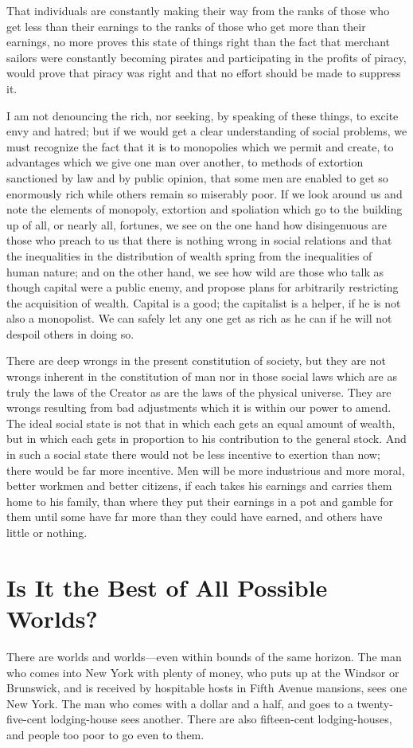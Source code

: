 \documentclass{book}
\begin{document}
That individuals are constantly making their way from the ranks of those who get less than their earnings to the ranks of those who get more than their earnings, no more proves this state of things right than the fact that merchant sailors were constantly becoming pirates and participating in the profits of piracy, would prove that piracy was right and that no effort should be made to suppress it.

I am not denouncing the rich, nor seeking, by speaking of these things, to excite envy and hatred; but if we would get a clear understanding of social problems, we must recognize the fact that it is to monopolies which we permit and create, to advantages which we give one man over another, to methods of extortion sanctioned by law and by public opinion, that some men are enabled to get so enormously rich while others remain so miserably poor. If we look around us and note the elements of monopoly, extortion and spoliation which go to the building up of all, or nearly all, fortunes, we see on the one hand how disingenuous are those who preach to us that there is nothing wrong in social relations and that the inequalities in the distribution of wealth spring from the inequalities of human nature; and on the other hand, we see how wild are those who talk as though capital were a public enemy, and propose plans for arbitrarily restricting the acquisition of wealth. Capital is a good; the capitalist is a helper, if he is not also a monopolist. We can safely let any one get as rich as he can if he will not despoil others in doing so.

There are deep wrongs in the present constitution of society, but they are not wrongs inherent in the constitution of man nor in those social laws which are as truly the laws of the Creator as are the laws of the physical universe. They are wrongs resulting from bad adjustments which it is within our power to amend. The ideal social state is not that in which each gets an equal amount of wealth, but in which each gets in proportion to his contribution to the general stock. And in such a social state there would not be less incentive to exertion than now; there would be far more incentive. Men will be more industrious and more moral, better workmen and better citizens, if each takes his earnings and carries them home to his family, than where they put their earnings in a pot and gamble for them until some have far more than they could have earned, and others have little or nothing.

\chapter{Is It the Best of All Possible Worlds?}
\label{chapter-7}
There are worlds and worlds—even within bounds of the same horizon. The man who comes into New York with plenty of money, who puts up at the Windsor or Brunswick, and is received by hospitable hosts in Fifth Avenue mansions, sees one New York. The man who comes with a dollar and a half, and goes to a twenty-five-cent lodging-house sees another. There are also fifteen-cent lodging-houses, and people too poor to go even to them.
\end{document}
